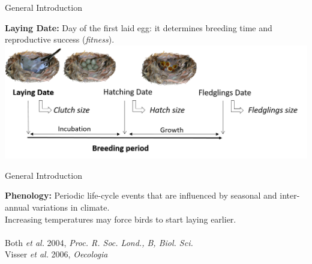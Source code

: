 \documentclass[compress]{beamer}
\begin{document}
\begin{frame}{General Introduction}\vspace{10pt}

\textbf{Laying Date:} Day of the first laid egg: it determines breeding time and reproductive success (\textit{fitness}). \\
 \vspace{0.5cm}
 \centering
 \includegraphics[height = 4 cm]{Image/timing breeding.png}

\end{frame}



\begin{frame}{General Introduction}\vspace{10pt}

\raggedright
\textbf{Phenology:} Periodic life-cycle events that are influenced by seasonal and inter-annual variations in climate.\\
\vspace{0.5cm}
Increasing temperatures may force birds to start laying earlier. \\
 \vspace{0.3cm}
 \centering
 \\

\raggedleft
\vspace{0.1cm}
\tiny
Both \textit{et al.} 2004, \textit{Proc. R. Soc. Lond., B, Biol. Sci.}\\
Visser \textit{et al.} 2006, \textit{Oecologia} 
  
\end{frame}
\end{document}
